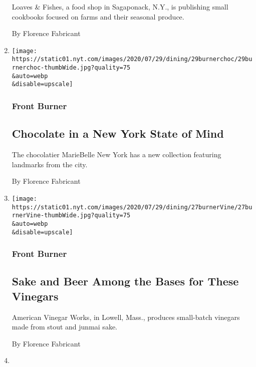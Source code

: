 \begin{enumerate}
  Loaves \& Fishes, a food shop in Sagaponack, N.Y., is publishing small
  cookbooks focused on farms and their seasonal produce.

  By Florence Fabricant
\item
  \href{/2020/07/27/dining/marie-belle-nyc-chocolate.html}{}

  \texttt{[image: https://static01.nyt.com/images/2020/07/29/dining/29burnerchoc/29burnerchoc-thumbWide.jpg?quality=75\\\&auto=webp\\\&disable=upscale]}

  \hypertarget{front-burner-2}{%
  \subsubsection{Front Burner}\label{front-burner-2}}

  \hypertarget{chocolate-in-a-new-york-state-of-mind}{%
  \subsection{Chocolate in a New York State of
  Mind}\label{chocolate-in-a-new-york-state-of-mind}}

  The chocolatier MarieBelle New York has a new collection featuring
  landmarks from the city.

  By Florence Fabricant
\item
  \href{/2020/07/27/dining/american-vinegar-works.html}{}

  \texttt{[image: https://static01.nyt.com/images/2020/07/29/dining/27burnerVine/27burnerVine-thumbWide.jpg?quality=75\\\&auto=webp\\\&disable=upscale]}

  \hypertarget{front-burner-3}{%
  \subsubsection{Front Burner}\label{front-burner-3}}

  \hypertarget{sake-and-beer-among-the-bases-for-these-vinegars}{%
  \subsection{Sake and Beer Among the Bases for These
  Vinegars}\label{sake-and-beer-among-the-bases-for-these-vinegars}}

  American Vinegar Works, in Lowell, Mass., produces small-batch
  vinegars made from stout and junmai sake.

  By Florence Fabricant
\item
  \href{/2020/07/27/dining/matthew-kenney-vegan-meals.html}{}


\end{enumerate}
